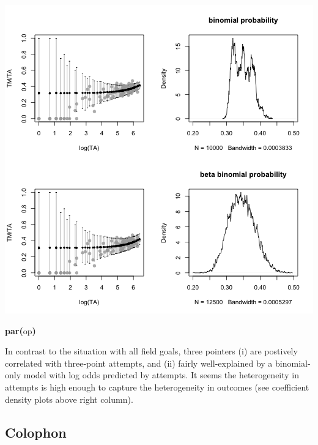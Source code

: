 \documentclass{article}
\makeatletter
\newcommand{\hlfunctioncall}[1]{\textcolor[rgb]{.5,0,.33}{\textbf{#1}}}%
\newcommand{\hlkeyword}[1]{\textbf{#1}}%
\newcommand{\hlsymbol}[1]{#1}%
\newenvironment{kframe}{%
 \def\FrameCommand##1{\hskip\@totalleftmargin \hskip-\fboxsep
 \colorbox{shadecolor}{##1}\hskip-\fboxsep
     \hskip-\linewidth \hskip-\@totalleftmargin \hskip\columnwidth}%
 \MakeFramed {\advance\hsize-\width
   \@totalleftmargin\z@ \linewidth\hsize
   \@setminipage}}%
 {\par\unskip\endMakeFramed}
\newenvironment{knitrout}{}{} %
\makeatother
\begin{document}
\begin{knitrout}
{\begin{kframe}
\includegraphics{post-bs-threes} \begin{flushleft}
\ttfamily\noindent
\hlfunctioncall{par}\hlkeyword{(}\hlsymbol{op}\hlkeyword{)}\mbox{}
\normalfont
\end{flushleft}
\end{kframe}}
\end{knitrout}


In contrast to the situation with all field goals, three pointers (i) are postively correlated with three-point attempts, and (ii) fairly well-explained by a binomial-only model with log odds predicted by attempts. 
It seems the heterogeneity in attempts is high enough to capture the heterogeneity in outcomes (see coefficient density plots above right column). 

\newpage
\subsection*{Colophon}
\end{document}
